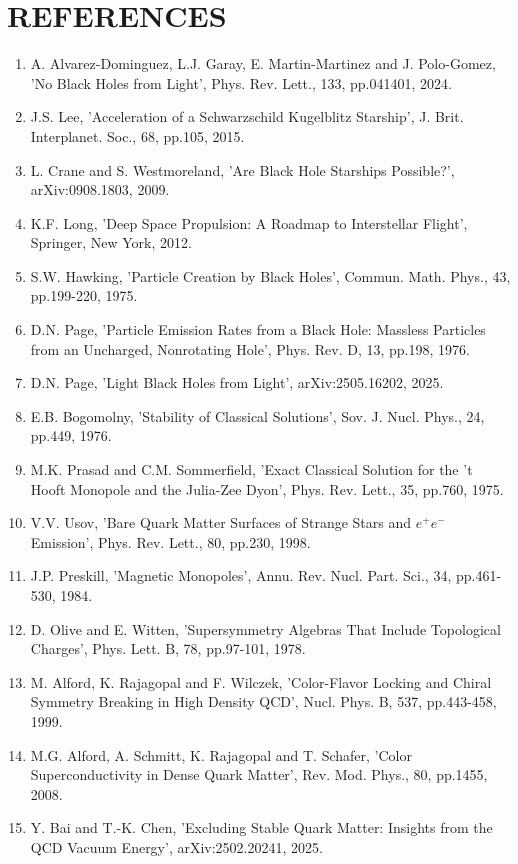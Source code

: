 \documentclass[12pt,a4paper]{article}
\begin{document}
\section*{REFERENCES}
\small
\begin{enumerate}
\item A. Alvarez-Dominguez, L.J. Garay, E. Martin-Martinez and J. Polo-Gomez, 'No Black Holes from Light', Phys. Rev. Lett., 133, pp.041401, 2024.
\item J.S. Lee, 'Acceleration of a Schwarzschild Kugelblitz Starship', J. Brit. Interplanet. Soc., 68, pp.105, 2015.
\item L. Crane and S. Westmoreland, 'Are Black Hole Starships Possible?', arXiv:0908.1803, 2009.
\item K.F. Long, 'Deep Space Propulsion: A Roadmap to Interstellar Flight', Springer, New York, 2012.
\item S.W. Hawking, 'Particle Creation by Black Holes', Commun. Math. Phys., 43, pp.199-220, 1975.
\item D.N. Page, 'Particle Emission Rates from a Black Hole: Massless Particles from an Uncharged, Nonrotating Hole', Phys. Rev. D, 13, pp.198, 1976.
\item D.N. Page, 'Light Black Holes from Light', arXiv:2505.16202, 2025.
\item E.B. Bogomolny, 'Stability of Classical Solutions', Sov. J. Nucl. Phys., 24, pp.449, 1976.
\item M.K. Prasad and C.M. Sommerfield, 'Exact Classical Solution for the 't Hooft Monopole and the Julia-Zee Dyon', Phys. Rev. Lett., 35, pp.760, 1975.
\item V.V. Usov, 'Bare Quark Matter Surfaces of Strange Stars and $e^+e^-$ Emission', Phys. Rev. Lett., 80, pp.230, 1998.
\item J.P. Preskill, 'Magnetic Monopoles', Annu. Rev. Nucl. Part. Sci., 34, pp.461-530, 1984.
\item D. Olive and E. Witten, 'Supersymmetry Algebras That Include Topological Charges', Phys. Lett. B, 78, pp.97-101, 1978.
\item M. Alford, K. Rajagopal and F. Wilczek, 'Color-Flavor Locking and Chiral Symmetry Breaking in High Density QCD', Nucl. Phys. B, 537, pp.443-458, 1999.
\item M.G. Alford, A. Schmitt, K. Rajagopal and T. Schafer, 'Color Superconductivity in Dense Quark Matter', Rev. Mod. Phys., 80, pp.1455, 2008.
\item Y. Bai and T.-K. Chen, 'Excluding Stable Quark Matter: Insights from the QCD Vacuum Energy', arXiv:2502.20241, 2025.

\end{enumerate}
\end{document}
